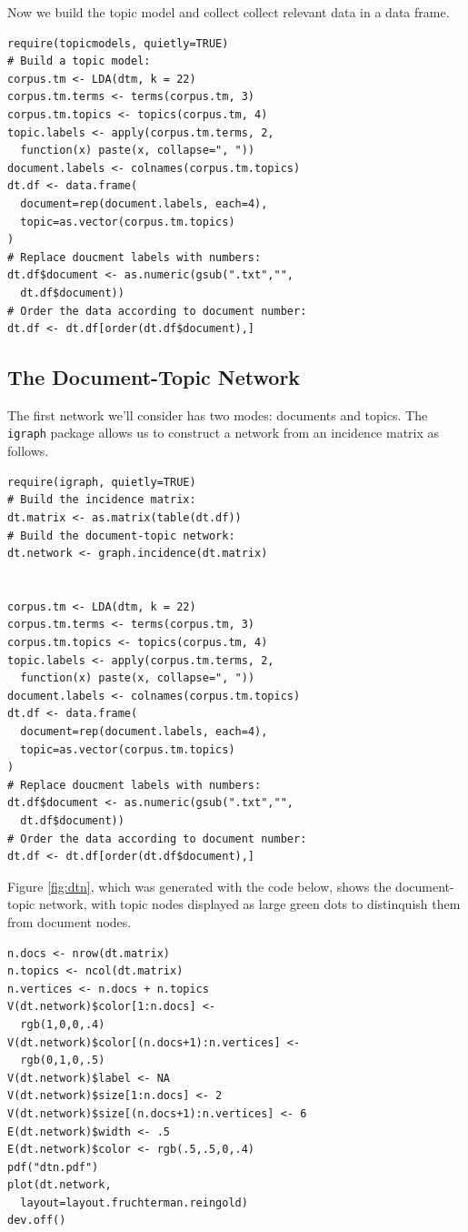 \documentclass[%
	final,
	notitlepage,
	narroweqnarray,
	inline,
	]{ieee}
\begin{document}
Now we build the topic model and collect collect relevant data in a data frame.

\begin{verbatim}
require(topicmodels, quietly=TRUE)
# Build a topic model:
corpus.tm <- LDA(dtm, k = 22)
corpus.tm.terms <- terms(corpus.tm, 3)
corpus.tm.topics <- topics(corpus.tm, 4)
topic.labels <- apply(corpus.tm.terms, 2, 
  function(x) paste(x, collapse=", "))
document.labels <- colnames(corpus.tm.topics)
dt.df <- data.frame(
  document=rep(document.labels, each=4),
  topic=as.vector(corpus.tm.topics)
)
# Replace doucment labels with numbers:
dt.df$document <- as.numeric(gsub(".txt","",
  dt.df$document))
# Order the data according to document number:
dt.df <- dt.df[order(dt.df$document),]
\end{verbatim}


\subsection{The Document-Topic Network}
\PARstart The first network we'll consider has two modes: documents and topics. 
The {\tt igraph} package allows us to construct a network from an incidence 
matrix as follows.

\begin{verbatim}
require(igraph, quietly=TRUE)
# Build the incidence matrix:
dt.matrix <- as.matrix(table(dt.df))
# Build the document-topic network:
dt.network <- graph.incidence(dt.matrix)


corpus.tm <- LDA(dtm, k = 22)
corpus.tm.terms <- terms(corpus.tm, 3)
corpus.tm.topics <- topics(corpus.tm, 4)
topic.labels <- apply(corpus.tm.terms, 2, 
  function(x) paste(x, collapse=", "))
document.labels <- colnames(corpus.tm.topics)
dt.df <- data.frame(
  document=rep(document.labels, each=4),
  topic=as.vector(corpus.tm.topics)
)
# Replace doucment labels with numbers:
dt.df$document <- as.numeric(gsub(".txt","",
  dt.df$document))
# Order the data according to document number:
dt.df <- dt.df[order(dt.df$document),]
\end{verbatim}

Figure \ref{fig:dtn}, which was generated with the code below, 
shows the document-topic network, with 
topic nodes displayed as large green dots to distinquish them from
document nodes.


\begin{verbatim}
n.docs <- nrow(dt.matrix)
n.topics <- ncol(dt.matrix)
n.vertices <- n.docs + n.topics
V(dt.network)$color[1:n.docs] <- 
  rgb(1,0,0,.4)
V(dt.network)$color[(n.docs+1):n.vertices] <- 
  rgb(0,1,0,.5)
V(dt.network)$label <- NA
V(dt.network)$size[1:n.docs] <- 2
V(dt.network)$size[(n.docs+1):n.vertices] <- 6
E(dt.network)$width <- .5
E(dt.network)$color <- rgb(.5,.5,0,.4)
pdf("dtn.pdf")
plot(dt.network, 
  layout=layout.fruchterman.reingold)
dev.off()
\end{verbatim}
\end{document}
